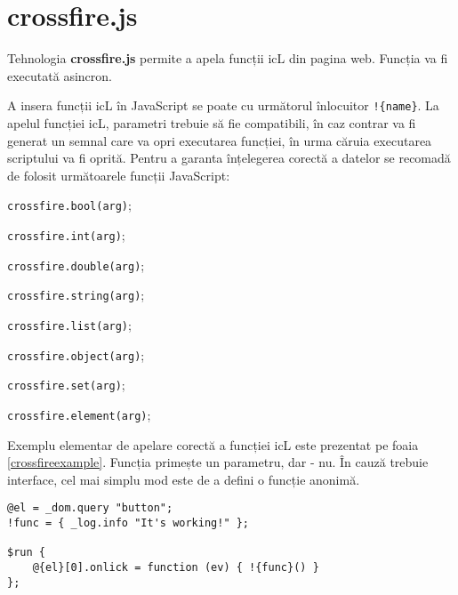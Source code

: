 \section{crossfire.js}

Tehnologia {\bf crossfire.js} permite a apela funcții icL din pagina web. Funcția va fi executată asincron.

A insera funcții icL în JavaScript se poate cu următorul înlocuitor \lstinline|!{name}|. La apelul funcției icL, parametri trebuie să fie compatibili, în caz contrar va fi generat un semnal care va opri executarea funcției, în urma căruia executarea scriptului va fi oprită. Pentru a garanta înțelegerea corectă a datelor se recomadă de folosit următoarele funcții JavaScript:
\begin{icItems}
	\item \lstinline|crossfire.bool(arg)|;
	\item \lstinline|crossfire.int(arg)|;
	\item \lstinline|crossfire.double(arg)|;
	\item \lstinline|crossfire.string(arg)|;
	\item \lstinline|crossfire.list(arg)|;
	\item \lstinline|crossfire.object(arg)|;
	\item \lstinline|crossfire.set(arg)|;
	\item \lstinline|crossfire.element(arg)|;
\end{icItems}

Exemplu elementar de apelare corectă a funcției icL este prezentat pe foaia \ref{crossfireexample}. Funcția  primește un parametru, dar  - nu. În cauză trebuie interface, cel mai simplu mod este de a defini o funcție anonimă.

\begin{lstlisting}[caption=Exemplu de apelare a funcției icL, label=crossfireexample]
@el = _dom.query "button";
!func = { _log.info "It's working!" };

$run {
	@{el}[0].onlick = function (ev) { !{func}() }
};
\end{lstlisting}

